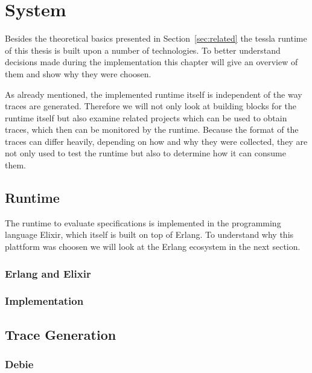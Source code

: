 %
\chapter{System}
\label{sec:system}

Besides the theoretical basics presented in Section~\ref{sec:related} the \gls{tessla} runtime of this thesis is built upon a number of technologies.
To better understand decisions made during the implementation this chapter will give an overview of them and show why they were choosen.

As already mentioned, the implemented runtime itself is independent of the way traces are generated.
Therefore we will not only look at building blocks for the runtime itself but also examine related projects which can be used to obtain traces, which then can be monitored by the runtime.
Because the format of the traces can differ heavily, depending on how and why they were collected, they are not only used to test the runtime but also to determine how it can consume them.

\section{ Runtime}
\label{sec:system:runtime}

The runtime to evaluate specifications is implemented in the programming language Elixir, which itself is built on top of Erlang.
To understand why this plattform was choosen we will look at the Erlang ecosystem in the next section.

\subsection{Erlang and Elixir}
\label{sec:system:eval_engine:erlang_elixir}
\subsection{Implementation}

\section{Trace Generation}
\label{sec:system:traces}

\subsection{Debie}
